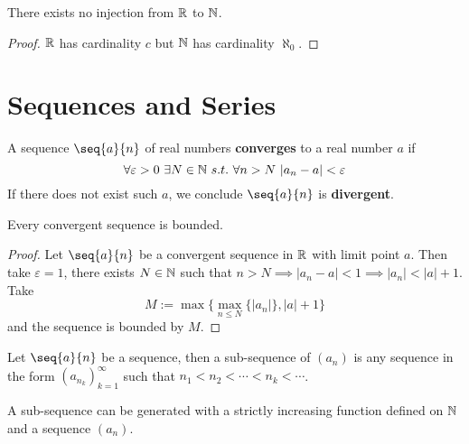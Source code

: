 \documentclass[11pt]{article}
\begin{document}
            \begin{theorem}
                There exists no injection from $\mathbb{R}$ to $\mathbb{N}$.
            \end{theorem}
            
            \begin{proof}
                $\mathbb{R}$ has cardinality $c$ but $\mathbb{N}$ has cardinality $\aleph_0$.
            \end{proof}
        
    \section{Sequences and Series}
        \begin{definition}
            A sequence $\seq{a}{n}$ of real numbers \textbf{converges} to a real number $a$ if
            \begin{equation}
                \forall \varepsilon > 0\ \exists N \in \mathbb{N}\ s.t.\ \forall n > N\ |a_n - a| < \varepsilon
            \end{equation}
            If there does not exist such $a$, we conclude $\seq{a}{n}$ is \textbf{divergent}.
        \end{definition}
        
        \begin{theorem}
            Every convergent sequence is bounded.
        \end{theorem}
        
        \begin{proof}
            Let $\seq{a}{n}$ be a convergent sequence in $\mathbb{R}$ with limit point $a$. Then take $\varepsilon=1$, there exists $N \in \mathbb{N}$ such that $n > N \implies |a_n - a| < 1 \implies |a_n| < |a| + 1$. Take 
            \begin{equation}
                M := \max\{\max_{n \leq N}\{|a_n|\}, |a| +1 \}
            \end{equation}
            and the sequence is bounded by $M$.
        \end{proof}
        
        \begin{definition}
            Let $\seq{a}{n}$ be a sequence, then a sub-sequence of $(a_n)$ is any sequence in the form $(a_{n_k})_{k=1}^\infty$ such that $n_1 < n_2 < \cdots < n_k < \cdots$.
        \end{definition}
        
        \begin{remark}
            A sub-sequence can be generated with a strictly increasing function defined on $\mathbb{N}$ and a sequence $(a_n)$.
        \end{remark}
        
\end{document}
